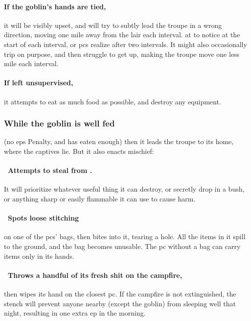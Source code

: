 \documentclass[10pt,twoside]{book}
\begin{document}
\paragraph{If the goblin's hands are tied,}
it will be visibly upset, and will try to subtly lead the troupe in a wrong direction, moving one mile away from the lair each \gls{interval}.
 at \tn[10] to notice at the start of each \gls{interval}, or \glspl{pc} realize after two \glspl{interval}.
It might also occasionally trip on purpose, and then struggle to get up, making the troupe move one less mile each \gls{interval}.

\paragraph{If left unsupervised,}
it attempts to eat as much food as possible, and destroy any equipment.

\subsubsection{While the goblin is well fed}
(no \glspl{ep} Penalty, and has eaten enough)
then it leads the troupe to its home, where the captives lie.
But it also enacts mischief:

\paragraph{\Square~Attempts to steal from .}
It will prioritize whatever useful thing it can destroy, or secretly drop in a bush, or anything sharp or easily flammable it can use to cause harm.

\paragraph{\Square~Spots loose stitching}
on one of the \glspl{pc}' bags, then bites into it, tearing a hole.
All the items in it spill to the ground, and the bag becomes unusable.
The \gls{pc} without a bag can carry items only in its hands.

\paragraph{\Square~Throws a handful of its fresh shit on the campfire,}
then wipes its hand on the closest \gls{pc}.
If the campfire is not extinguished, the stench will prevent anyone nearby (except the goblin) from sleeping well that night, resulting in one extra \gls{ep} in the morning.
\end{document}
